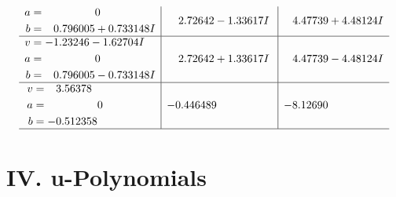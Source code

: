 \documentclass[1p]{elsarticle_modified}
\theoremstyle{definition}
\begin{document}
$$\begin{array}{c|c|c}
\begin{aligned}
a &= \phantom{-0.000000 } 0 \\
b &= \phantom{-}0.796005 + 0.733148 I\end{aligned}
 & \phantom{-}2.72642 - 1.33617 I & \phantom{-}4.47739 + 4.48124 I \\ \hline\begin{aligned}
v &= -1.23246 - 1.62704 I \\
a &= \phantom{-0.000000 } 0 \\
b &= \phantom{-}0.796005 - 0.733148 I\end{aligned}
 & \phantom{-}2.72642 + 1.33617 I & \phantom{-}4.47739 - 4.48124 I \\ \hline\begin{aligned}
v &= \phantom{-}3.56378\phantom{ +0.000000I} \\
a &= \phantom{-0.000000 } 0 \\
b &= -0.512358\phantom{ +0.000000I}\end{aligned}
 & -0.446489\phantom{ +0.000000I} & -8.12690\phantom{ +0.000000I}\\
 \hline 
 \end{array}$$\newpage
\newpage\renewcommand{\arraystretch}{1}
\centering \section*{ IV. u-Polynomials}
\end{document}
